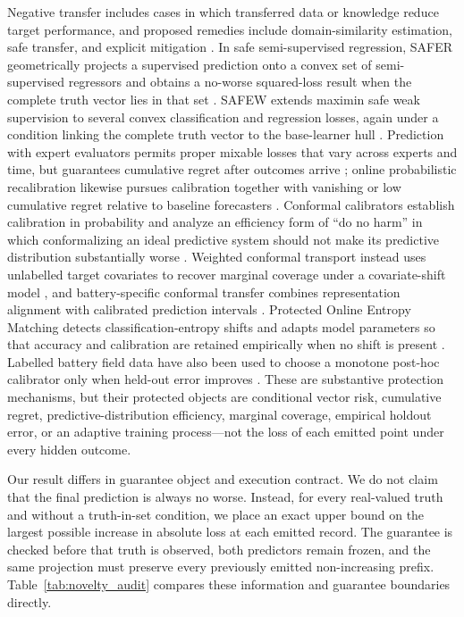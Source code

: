 \documentclass[11pt]{article}
\begin{document}
Negative transfer includes cases in which transferred data or knowledge reduce target performance, and proposed remedies include domain-similarity estimation, safe transfer, and explicit mitigation \citep{zhang2023negative}. In safe semi-supervised regression, SAFER geometrically projects a supervised prediction onto a convex set of semi-supervised regressors and obtains a no-worse squared-loss result when the complete truth vector lies in that set \citep{li2017safer}. SAFEW extends maximin safe weak supervision to several convex classification and regression losses, again under a condition linking the complete truth vector to the base-learner hull \citep{li2021safeweak}. Prediction with expert evaluators permits proper mixable losses that vary across experts and time, but guarantees cumulative regret after outcomes arrive \citep{chernov2009evaluators}; online probabilistic recalibration likewise pursues calibration together with vanishing or low cumulative regret relative to baseline forecasters \citep{marx2025calibrated,deshpande2025calibrated}. Conformal calibrators establish calibration in probability and analyze an efficiency form of ``do no harm'' in which conformalizing an ideal predictive system should not make its predictive distribution substantially worse \citep{vovk2020conformal}. Weighted conformal transport instead uses unlabelled target covariates to recover marginal coverage under a covariate-shift model \citep{tuwani2023transport}, and battery-specific conformal transfer combines representation alignment with calibrated prediction intervals \citep{filgueira2026conformalized}. Protected Online Entropy Matching detects classification-entropy shifts and adapts model parameters so that accuracy and calibration are retained empirically when no shift is present \citep{bar2024protected}. Labelled battery field data have also been used to choose a monotone post-hoc calibrator only when held-out error improves \citep{nyachionjeka2026safecalibrated}. These are substantive protection mechanisms, but their protected objects are conditional vector risk, cumulative regret, predictive-distribution efficiency, marginal coverage, empirical holdout error, or an adaptive training process---not the loss of each emitted point under every hidden outcome.

Our result differs in guarantee object and execution contract. We do not claim that the final prediction is always no worse. Instead, for every real-valued truth and without a truth-in-set condition, we place an exact upper bound on the largest possible increase in absolute loss at each emitted record. The guarantee is checked before that truth is observed, both predictors remain frozen, and the same projection must preserve every previously emitted non-increasing prefix. Table~\ref{tab:novelty_audit} compares these information and guarantee boundaries directly.
\end{document}

